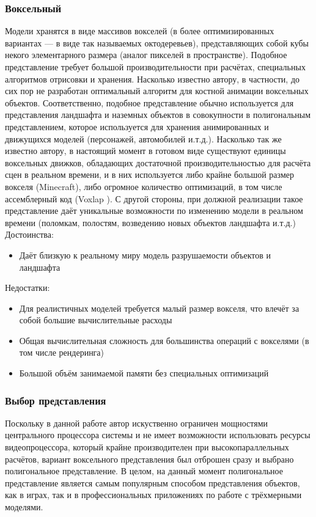 \documentclass[a4paper,12pt]{report}
\numberwithin{equation}{section}
\begin{document}
\subsubsection*{Воксельный}
Модели хранятся в виде массивов вокселей (в более оптимизированных вариантах --- в виде так называемых октодеревьев), представляющих собой кубы некого элементарного размера (аналог пикселей в пространстве). Подобное представление требует большой производительности при расчётах, специальных алгоритмов отрисовки и хранения. Насколько известно автору, в частности, до сих пор не разработан оптимальный алгоритм для костной анимации воксельных объектов. Соответственно, подобное представление обычно используется для представления ландшафта и наземных объектов в совокупности в полигональным представлением, которое используется для хранения анимированных и движущихся моделей (персонажей, автомобилей и.т.д.). Насколько так же известно автору, в настоящий момент в готовом виде существуют единицы воксельных движков, обладающих достаточной производительностью для расчёта сцен в реальном времени, и в них используется либо крайне большой размер вокселя (Minecraft), либо огромное количество оптимизаций, в том числе ассемблерный код (Voxlap \cite{voxlapsrc}). С другой стороны, при должной реализации такое представление даёт уникальные возможности по изменению модели в реальном времени (поломкам, полостям, возведению новых объектов ландшафта и.т.д.) \\
Достоинства:
\begin{itemize}
\item Даёт близкую к реальному миру модель разрушаемости объектов и ландшафта
\end{itemize}
Недостатки:
\begin{itemize}
\item Для реалистичных моделей требуется малый размер вокселя, что влечёт за собой большие вычислительные расходы
\item Общая вычислительная сложность для большинства операций с вокселями (в том числе рендеринга)
\item Большой объём занимаемой памяти без специальных оптимизаций
\end{itemize}

\subsubsection*{Выбор представления}
Поскольку в данной работе автор искуственно ограничен мощностями центрального процессора системы и не имеет возможности использовать ресурсы видеопроцессора, который крайне производителен при высокопараллельных расчётов, вариант воксельного представления был отброшен сразу и выбрано полигональное представление. В целом, на данный момент полигональное представление является самым популярным способом представления объектов, как в играх, так и в профессиональных приложениях по работе с трёхмерными моделями.
\end{document}

